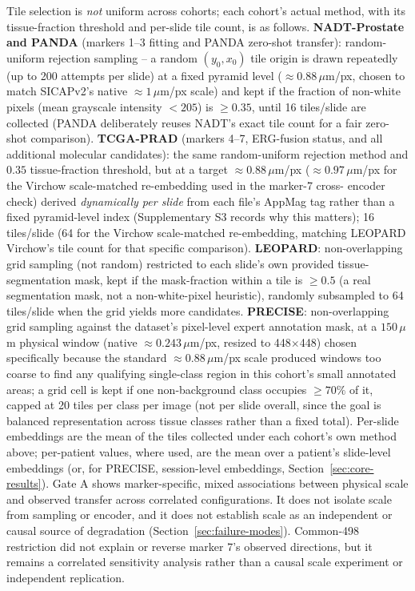 Tile selection is \emph{not} uniform across cohorts; each cohort's actual method, with its
tissue-fraction threshold and per-slide tile count, is as follows. \textbf{NADT-Prostate and
PANDA} (markers 1--3 fitting and PANDA zero-shot transfer): random-uniform rejection sampling
-- a random $(y_0,x_0)$ tile origin is drawn repeatedly (up to 200 attempts per slide) at a
fixed pyramid level ($\approx 0.88\,\mu$m/px, chosen to match SICAPv2's native
$\approx 1\,\mu$m/px scale) and kept if the fraction of non-white pixels (mean grayscale
intensity $<205$) is $\geq 0.35$, until 16 tiles/slide are collected (PANDA deliberately reuses
NADT's exact tile count for a fair zero-shot comparison). \textbf{TCGA-PRAD} (markers 4--7,
ERG-fusion status, and all additional molecular candidates): the same random-uniform
rejection method and $0.35$ tissue-fraction threshold, but at a target $\approx 0.88\,\mu$m/px
($\approx 0.97\,\mu$m/px for the Virchow scale-matched re-embedding used in the marker-7 cross-
encoder check) derived \emph{dynamically per slide} from each file's AppMag tag rather than a
fixed pyramid-level index (Supplementary S3 records why this matters); 16 tiles/slide (64 for
the Virchow scale-matched re-embedding, matching LEOPARD Virchow's tile count for that specific
comparison). \textbf{LEOPARD}: non-overlapping grid sampling (not random) restricted to each
slide's own provided tissue-segmentation mask, kept if the mask-fraction within a tile is
$\geq 0.5$ (a real segmentation mask, not a non-white-pixel heuristic), randomly subsampled to
64 tiles/slide when the grid yields more candidates. \textbf{PRECISE}: non-overlapping grid
sampling against the dataset's pixel-level expert annotation mask, at a $150\,\mu$m physical
window (native $\approx 0.243\,\mu$m/px, resized to 448$\times$448) chosen specifically because
the standard $\approx 0.88\,\mu$m/px scale produced windows too coarse to find any qualifying
single-class region in this cohort's small annotated areas; a grid cell is kept if one
non-background class occupies $\geq 70\%$ of it, capped at 20 tiles per class per image (not
per slide overall, since the goal is balanced representation across tissue classes rather than
a fixed total). Per-slide embeddings are the mean of the tiles collected under each cohort's own
method above; per-patient values, where used, are the mean over a patient's slide-level
embeddings (or, for PRECISE, session-level embeddings, Section~\ref{sec:core-results}).
Gate A shows marker-specific, mixed associations between physical scale and observed transfer
across correlated configurations. It does not isolate scale from sampling or encoder, and it
does not establish scale as an independent or causal source of degradation
(Section~\ref{sec:failure-modes}). Common-498 restriction did not explain or reverse marker
7's observed directions, but it remains a correlated sensitivity analysis rather than a
causal scale experiment or independent replication.

